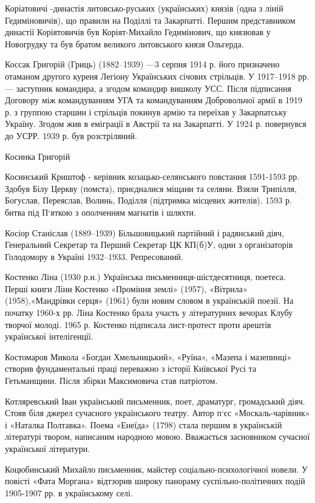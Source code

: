 Коріатовичі -династія литовсько-руських (українських) князів (одна з ліній Гедиміновичів), що правили на Поділлі та Закарпатті. Першим представником династії Коріятовичів був Коріят-Михайло Гедимінович, що князював у Новогрудку та був братом великого литовського князя Ольгерда.

Коссак Григорій (Гриць) (1882–1939) —3 серпня 1914 р. його призначено отаманом другого куреня Легіону Українських січових стрільців. У 1917–1918 рр. — заступник командира, а згодом командир вишколу УСС. Після підписання Договору між командуванням УГА та командуванням Добровольчої армії в 1919 р. з группою старшин і стрільців покинув армію та переїхав у Закарпатську Україну. Згодом жив в еміграції в Австрії та на Закарпатті. У 1924 р. повернувся до УСРР. 1939 р. був розстріляний.

Косинка Григорій 

Косинський Криштоф  - керівник козацько-селянського повстання 1591-1593 рр. Здобув Білу Церкву (помста), приєдналися міщани та селяни. Взяли Трипілля, Богуслав, Переяслав, Волинь, Поділля (підтримка місцевих жителів). 1593 р. битва під П‘яткою з ополченням магнатів і шляхти.

Косіор Станіслав (1889–1939) Більшовицький партійний і радянський діяч, Генеральний Секретар та Перший Секретар ЦК КП(б)У, один з організаторів Голодомору в Україні 1932–1933. Репресований.

Костенко Ліна (1930 р.н.) Українська письменниця-шістдесятниця, поетеса. Перші книги Ліни Костенко «Проміння землі» (1957), «Вітрила» (1958),«Мандрівки серця» (1961) були новим словом в українській поезії. На початку 1960-х рр. Ліна Костенко брала участь у літературних вечорах Клубу творчої молоді. 1965 р. Костенко підписала лист-протест проти арештів української інтелігенції.

Костомаров Микола «Богдан Хмельницький», «Руїна», «Мазепа і мазепинці» створив фундаментальні праці переважно з історії Київської Русі та Гетьманщини. Після збірки Максимовича став патріотом.

Котляревський  Іван український письменник, поет, драматург, громадський діяч. Стояв біля джерел сучасного українського театру. Автор п‘єс «Москаль-чарівник» і «Наталка Полтавка». Поема «Енеїда» (1798) стала першим в українській літературі твором, написаним народною мовою. Вважається засновником сучасної української літератури.

Коцюбинський Михайло письменник, майстер соціально-психологічної новели. У повісті «Фата Моргана» відтзорив широку панораму суспільно-політичних подій 1905-1907 рр. в українському селі.

